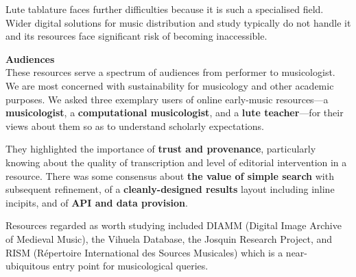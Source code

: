 \documentclass[a0,landscape]{a0poster}
\begin{document}
\begin{multicols}{3}
\begin{sloppypar}
  \noindent Lute tablature faces further difficulties because it is
  such a specialised field. Wider digital solutions for music
  distribution and study typically do not handle it and its resources
  face significant risk of becoming inaccessible.



  \columnbreak
  \noindent\textbf{\LARGE Audiences}\\

  \noindent These resources serve a spectrum of audiences from
  performer to musicologist. We are most concerned with sustainability
  for musicology and other academic purposes. We asked three exemplary
  users of online early-music resources---a \textbf{musicologist}, a
  \textbf{computational musicologist}, and a \textbf{lute
    teacher}---for their views about them so as to understand
  scholarly expectations.

  \noindent They highlighted the importance of \textbf{trust and
    provenance}, particularly knowing about the quality of
  transcription and level of editorial intervention in a
  resource. There was some consensus about \textbf{the value of simple
    search} with subsequent refinement, of a \textbf{cleanly-designed
    results} layout including inline incipits, and of \textbf{API and
    data provision}.

  \noindent Resources regarded as worth studying included DIAMM
  (Digital Image Archive of Medieval Music), the Vihuela Database, the
  Josquin Research Project, and RISM (R\'epertoire International des
  Sources Musicales) which is a near-ubiquitous entry point for
  musicological queries.


\end{sloppypar}
\end{multicols}
\end{document}
